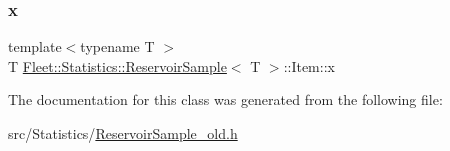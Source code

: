 \subsubsection{\texorpdfstring{x}{x}}
{\footnotesize\ttfamily template$<$typename T $>$ \\
T \hyperlink{class_fleet_1_1_statistics_1_1_reservoir_sample}{Fleet\+::\+Statistics\+::\+Reservoir\+Sample}$<$ T $>$\+::Item\+::x}



The documentation for this class was generated from the following file\+:\begin{DoxyCompactItemize}
\item 
src/\+Statistics/\hyperlink{_reservoir_sample__old_8h}{Reservoir\+Sample\+\_\+old.\+h}\end{DoxyCompactItemize}
